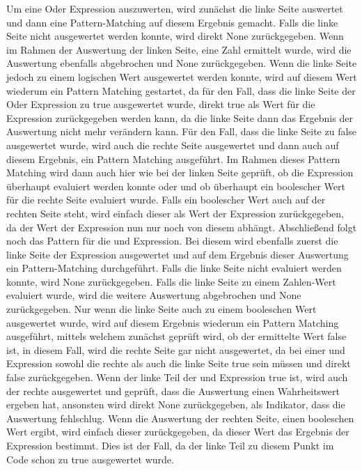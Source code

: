 \documentclass[a4paper, 1ppt]{article}
\begin{document}
Um eine Oder Expression auszuwerten, wird zunächst die linke Seite auswertet und dann eine Pattern-Matching auf diesem Ergebnis gemacht. Falls die linke Seite nicht ausgewertet werden konnte, wird direkt None zurückgegeben. Wenn im Rahmen der Auswertung der linken Seite, eine Zahl ermittelt wurde, wird die Auswertung ebenfalls abgebrochen und None zurückgegeben. Wenn die linke Seite jedoch zu einem logischen Wert ausgewertet werden konnte, wird auf diesem Wert wiederum ein Pattern Matching gestartet, da für den Fall, dass die linke Seite der Oder Expression zu true ausgewertet wurde, direkt true als Wert für die Expression zurückgegeben werden kann, da die linke Seite dann das Ergebnis der Auswertung nicht mehr verändern kann. Für den Fall, dass die linke Seite zu false ausgewertet wurde, wird auch die rechte Seite ausgewertet und dann auch auf diesem Ergebnis, ein Pattern Matching ausgeführt.
Im Rahmen dieses Pattern Matching wird dann auch hier wie bei der linken Seite geprüft, ob die Expression überhaupt evaluiert werden konnte oder und ob überhaupt ein boolescher Wert für die rechte Seite evaluiert wurde. Falls ein boolescher Wert auch auf der rechten Seite steht, wird einfach dieser als Wert der Expression zurückgegeben, da der Wert der Expression nun nur noch von diesem abhängt.
Abschließend folgt noch das Pattern für die und Expression. Bei diesem wird ebenfalls zuerst die linke Seite der Expression ausgewertet und auf dem Ergebnis dieser Auswertung ein Pattern-Matching durchgeführt. Falls die linke Seite nicht evaluiert werden konnte, wird None zurückgegeben. Falls die linke Seite zu einem Zahlen-Wert evaluiert wurde, wird die weitere Auswertung abgebrochen und None zurückgegeben. Nur wenn die linke Seite auch zu einem booleschen Wert ausgewertet wurde, wird auf diesem Ergebnis wiederum ein Pattern Matching ausgeführt, mittels welchem zunächst geprüft wird, ob der ermittelte Wert false ist, in diesem Fall, wird die rechte Seite gar nicht ausgewertet, da bei einer und Expression sowohl die rechte als auch die linke Seite true sein müssen und direkt false zurückgegeben. Wenn der linke Teil der und Expression true ist, wird auch der rechte ausgewertet und geprüft, dass die Auswertung einen Wahrheitswert ergeben hat, ansonsten wird direkt None zurückgegeben, als Indikator, dass die Auswertung fehlschlug. Wenn die Auswertung der rechten Seite, einen booleschen Wert ergibt, wird einfach dieser zurückgegeben, da dieser Wert das Ergebnis der Expression bestimmt. Dies ist der Fall, da der linke Teil zu diesem Punkt im Code schon zu true ausgewertet wurde.
\end{document}
